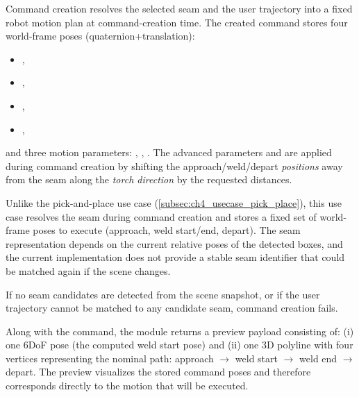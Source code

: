 Command creation resolves the selected seam and the user trajectory into a fixed robot motion plan at command-creation time.
The created command stores four world-frame poses (quaternion+translation):
\begin{itemize}[nosep]
    \item {},
    \item {},
    \item {},
    \item {},
\end{itemize}
and three motion parameters:
, , .
The advanced parameters  and  are applied during command creation by shifting the approach/weld/depart \emph{positions} away from the seam along the \emph{torch direction} by the requested distances.

Unlike the pick-and-place use case (\autoref{subsec:ch4_usecase_pick_place}), this use case resolves the seam during command creation and stores a fixed set of world-frame poses to execute (approach, weld start/end, depart).
The seam representation depends on the current relative poses of the detected boxes, and the current implementation does not provide a stable seam identifier that could be matched again if the scene changes.

If no seam candidates are detected from the scene snapshot, or if the user trajectory cannot be matched to any candidate seam, command creation fails.

Along with the command, the module returns a preview payload consisting of:
(i) one 6DoF pose (the computed weld start pose) and
(ii) one 3D polyline with four vertices representing the nominal path:
approach $\rightarrow$ weld start $\rightarrow$ weld end $\rightarrow$ depart.
The preview visualizes the stored command poses and therefore corresponds directly to the motion that will be executed.


